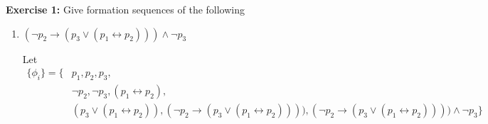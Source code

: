 \textbf{Exercise 1:} Give formation sequences of the following
\begin{enumerate}
    \item $(\neg p_2 \to (p_3 \lor (p_1 \leftrightarrow p_2))) \land \neg p_3$
    \begin{mdframed}
        Let \vspace{-0.7cm}
        \begin{align*}
            \{\phi_i\} = \{&p_1, p_2, p_3, \\ &\neg p_2, \neg p_3, (p_1 \leftrightarrow p_2), \\ &(p_3 \lor (p_1 \leftrightarrow p_2)), (\neg p_2 \rightarrow (p_3 \lor (p_1 \leftrightarrow p_2)))),  (\neg p_2 \rightarrow (p_3 \lor (p_1 \leftrightarrow p_2))))\land \neg p_3\}
        \end{align*}
    \end{mdframed}
\end{enumerate}


